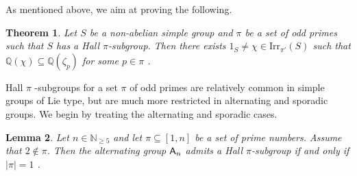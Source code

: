 \documentclass[12pt]{amsart}
\newtheorem{theorem}{Theorem}[section]
\newtheorem{lemma}[theorem]{Lemma}
\theoremstyle{definition}
\numberwithin{equation}{section}
\newcommand{\Irr}{{\mathrm {Irr}}}
\newcommand{\QQ}{{\mathbb Q}}
\newcommand{\Al}{\textup{\textsf{A}}}
\begin{document}
As mentioned above, we aim at %
proving the following.

\begin{theorem}\label{thm:simple}
Let %
$S$ be a non-abelian simple group and $\pi$ be a set of odd
primes such that $S$ has a Hall $\pi$-subgroup. Then %
there exists
$1_S\neq\chi\in\Irr_{\pi'}(S)$ %
such that
$\QQ(\chi)\subseteq\QQ(\zeta_p)$ for some $p\in\pi$%
.
\end{theorem}


Hall $\pi$%
-subgroups for a set $\pi$ of odd primes are relatively
common in simple groups of Lie type, but are much more restricted in
alternating and sporadic groups. We begin by treating the
alternating and sporadic cases.

\begin{lemma}\label{lem:noHall}
Let $n\in\mathbb{N}_{\geq 5}$ and %
let $\pi\subseteq [1,n]$ be a set
of prime numbers. Assume that $2\notin\pi$. Then the alternating
group $\Al_n$ admits a Hall $\pi$-subgroup if and only if $|\pi|=1$%
.
\end{lemma}
\end{document}
